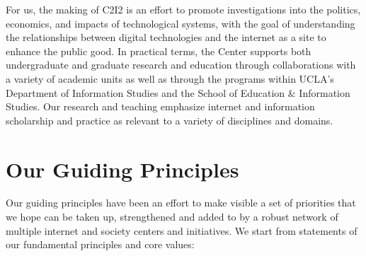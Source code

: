 \documentclass[11pt]{article}
\begin{document}
For us, the making of C2I2 is an effort to promote investigations into the politics, economics, and impacts of technological systems, with the goal of understanding the relationships between digital technologies and the internet as a site to enhance the public good. In practical terms, the Center supports both undergraduate and graduate research and education through collaborations with a variety of academic units as well as through the programs within UCLA’s Department of Information Studies and the School of Education \& Information Studies. Our research and teaching emphasize internet and information scholarship and practice as relevant to a variety of disciplines and domains. 


\section{Our Guiding Principles}
Our guiding principles have been an effort to make visible a set of priorities that we hope can be taken up, strengthened and added to by a robust network of multiple internet and society centers and initiatives. We start from statements of our fundamental principles and core values:
\end{document}
